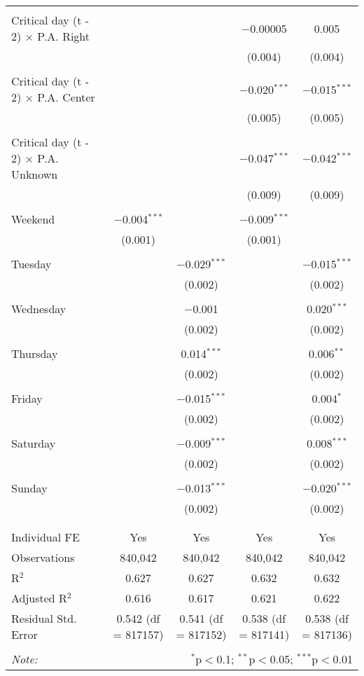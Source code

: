 \documentclass[
]{article}
\begin{document}
\begin{table}[!htbp]
{\begin{tabular}{@{\extracolsep{5pt}}lcccc}
  & & & & \\ 
 Critical day (t - 2) $\times$ P.A. Right &  &  & $-$0.00005 & 0.005 \\ 
  &  &  & (0.004) & (0.004) \\ 
  & & & & \\ 
 Critical day (t - 2) $\times$ P.A. Center &  &  & $-$0.020$^{***}$ & $-$0.015$^{***}$ \\ 
  &  &  & (0.005) & (0.005) \\ 
  & & & & \\ 
 Critical day (t - 2) $\times$ P.A. Unknown &  &  & $-$0.047$^{***}$ & $-$0.042$^{***}$ \\ 
  &  &  & (0.009) & (0.009) \\ 
  & & & & \\ 
 Weekend & $-$0.004$^{***}$ &  & $-$0.009$^{***}$ &  \\ 
  & (0.001) &  & (0.001) &  \\ 
  & & & & \\ 
 Tuesday &  & $-$0.029$^{***}$ &  & $-$0.015$^{***}$ \\ 
  &  & (0.002) &  & (0.002) \\ 
  & & & & \\ 
 Wednesday &  & $-$0.001 &  & 0.020$^{***}$ \\ 
  &  & (0.002) &  & (0.002) \\ 
  & & & & \\ 
 Thursday &  & 0.014$^{***}$ &  & 0.006$^{**}$ \\ 
  &  & (0.002) &  & (0.002) \\ 
  & & & & \\ 
 Friday &  & $-$0.015$^{***}$ &  & 0.004$^{*}$ \\ 
  &  & (0.002) &  & (0.002) \\ 
  & & & & \\ 
 Saturday &  & $-$0.009$^{***}$ &  & 0.008$^{***}$ \\ 
  &  & (0.002) &  & (0.002) \\ 
  & & & & \\ 
 Sunday &  & $-$0.013$^{***}$ &  & $-$0.020$^{***}$ \\ 
  &  & (0.002) &  & (0.002) \\ 
  & & & & \\ 
\hline \\[-1.8ex] 
Individual FE & Yes & Yes & Yes & Yes \\ 
Observations & 840,042 & 840,042 & 840,042 & 840,042 \\ 
R$^{2}$ & 0.627 & 0.627 & 0.632 & 0.632 \\ 
Adjusted R$^{2}$ & 0.616 & 0.617 & 0.621 & 0.622 \\ 
Residual Std. Error & 0.542 (df = 817157) & 0.541 (df = 817152) & 0.538 (df = 817141) & 0.538 (df = 817136) \\ 
\hline 
\hline \\[-1.8ex] 
\textit{Note:}  & \multicolumn{4}{r}{$^{*}$p$<$0.1; $^{**}$p$<$0.05; $^{***}$p$<$0.01} \\ 
\end{tabular}
} 
\end{table} 
\newpage
\end{document}
